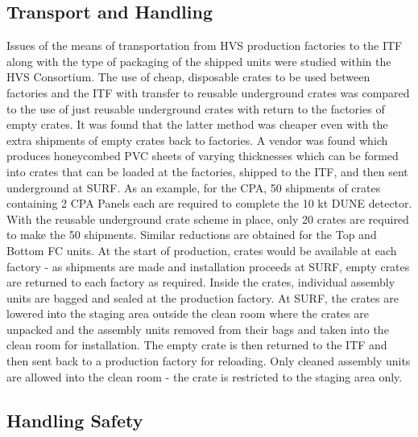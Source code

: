 \subsection{Transport and Handling}
\label{sec:fdsp-hv-transport-transport}
Issues of the means of transportation from HVS production factories to the ITF along with the type of packaging of the shipped units were studied within the HVS Consortium.  The use of cheap, disposable crates to be used between factories and the ITF with transfer to reusable underground crates was compared to the use of just reusable underground crates with return to the factories of empty crates.  It was found that the latter method was cheaper even with the extra shipments of empty crates back to factories.  A vendor was found which produces honeycombed PVC sheets of varying thicknesses which can be formed into crates that can be loaded at the factories, shipped to the ITF, and then sent underground at SURF.  As an example, for the CPA, 50 shipments of crates containing 2 CPA Panels each are required to complete the 10 kt DUNE detector.  With the reusable underground crate scheme in place, only 20 crates are required to make the 50 shipments.  Similar reductions are obtained for the Top and Bottom FC units.  At the start of production, crates would be available at each factory - as shipments are made and installation proceeds at SURF, empty crates are returned to each factory as required.  Inside the crates, individual assembly units are bagged and sealed at the production factory.  At SURF, the crates are lowered into the staging area outside the clean room where the crates are unpacked and the assembly units removed from their bags and taken into the clean room for installation.  The empty crate is then returned to the ITF and then sent back to a production factory for reloading.  Only cleaned assembly units are allowed into the clean room - the crate is restricted to the staging area only.
\subsection{Handling Safety}
\label{sec:fdsp-hv-transport-safety}



